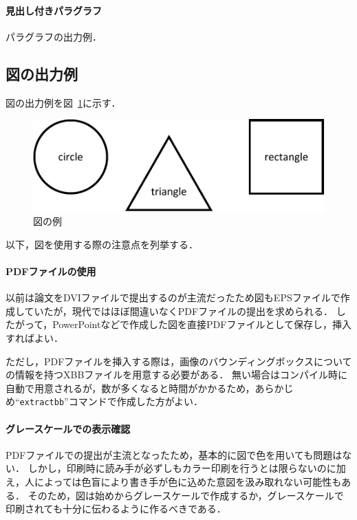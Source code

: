 \documentclass{ipsj}
\theoremstyle{definition}
\newcommand{\Fig}[1]{図~#1}
\begin{document}
\paragraph{見出し付きパラグラフ}

パラグラフの出力例．



\subsection{図の出力例}

図の出力例を\Fig{\ref{fig:sample}}に示す．

\begin{figure}[t]
  \centering
  \includegraphics{./figures/sample_figure.pdf}
  \caption{図の例}
  \label{fig:sample}
\end{figure}

以下，図を使用する際の注意点を列挙する．

\paragraph{PDFファイルの使用}

以前は論文をDVIファイルで提出するのが主流だったため図もEPSファイルで作成していたが，現代ではほぼ間違いなくPDFファイルの提出を求められる．
したがって，PowerPointなどで作成した図を直接PDFファイルとして保存し，挿入すればよい．

ただし，PDFファイルを挿入する際は，画像のバウンディングボックスについての情報を持つXBBファイルを用意する必要がある．
無い場合はコンパイル時に自動で用意されるが，数が多くなると時間がかかるため，あらかじめ``\texttt{extractbb}''コマンドで作成した方がよい．

\paragraph{グレースケールでの表示確認}

PDFファイルでの提出が主流となったため，基本的に図で色を用いても問題はない．
しかし，印刷時に読み手が必ずしもカラー印刷を行うとは限らないのに加え，人によっては色盲により書き手が色に込めた意図を汲み取れない可能性もある．
そのため，図は始めからグレースケールで作成するか，グレースケールで印刷されても十分に伝わるように作るべきである．
\end{document}
